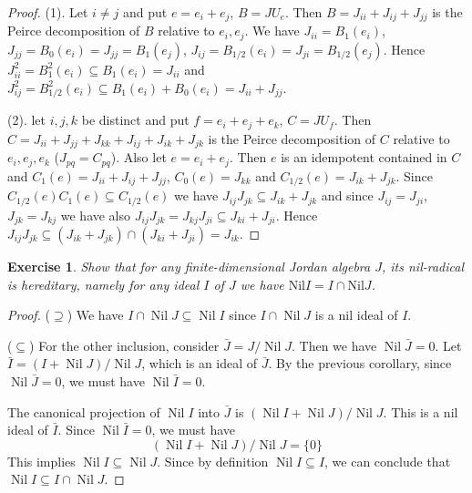 \documentclass{article}
\newtheorem{exercise}[theorem]{Exercise}
\begin{document}
\begin{proof} 
(1). Let $i \ne j$ and put $e = e_i + e_j$, $B = JU_e$. Then $B = J_{ii} + J_{ij} + J_{jj}$ is the Peirce decomposition of $B$ relative to $e_i, e_j$. We have $J_{ii} = B_1(e_i)$, $J_{jj} = B_0(e_i) = J_{jj} = B_1(e_j)$, $J_{ij} = B_{1/2}(e_i) = J_{ji} = B_{1/2}(e_j)$. Hence $J_{ii}^2 = B_1^2(e_i) \subseteq B_1(e_i) = J_{ii}$ and $J_{ij}^2 = B_{1/2}^2(e_i) \subseteq B_1(e_i) + B_0(e_i) = J_{ii} + J_{jj}$.

(2). let $i,j,k$ be distinct and put $f = e_i + e_j + e_k$, $C = JU_f$. Then $C = J_{ii} + J_{jj} + J_{kk} + J_{ij} + J_{ik} + J_{jk}$ is the Peirce decomposition of $C$ relative to $e_i, e_j, e_k$ ($J_{pq} = C_{pq}$). Also let $e = e_i + e_j$. Then $e$ is an idempotent contained in $C$ and $C_1(e) = J_{ii} + J_{ij} + J_{jj}$, $C_0(e) = J_{kk}$ and $C_{1/2}(e) = J_{ik} + J_{jk}$. Since $C_{1/2}(e)C_1(e) \subseteq C_{1/2}(e)$ we have $J_{ij}J_{jk} \subseteq J_{ik} + J_{jk}$ and since $J_{ij}=J_{ji}$, $J_{jk}=J_{kj}$ we have also $J_{ij}J_{jk} = J_{kj}J_{ji} \subseteq J_{ki} + J_{ji}$. Hence $J_{ij}J_{jk} \subseteq (J_{ik} + J_{jk}) \cap (J_{ki} + J_{ji}) = J_{ik}$. 
\end{proof}

\begin{exercise}
Show that for any finite-dimensional Jordan algebra $J$, its nil-radical is hereditary, namely for any ideal $I$ of $J$ we have $\text{Nil}I = I \cap \text{Nil}J$.  
\end{exercise}

\begin{proof} 
($\supseteq$) We have $I \cap \operatorname{Nil} J \subseteq \operatorname{Nil} I$ since $I \cap \operatorname{Nil} J$ is a nil ideal of $I$.  

($\subseteq$) For the other inclusion, consider $\bar{J} = J/\operatorname{Nil} J$. Then we have $\operatorname{Nil} \bar{J} = 0$.  
Let $\bar{I} = (I + \operatorname{Nil} J) / \operatorname{Nil} J$, which is an ideal of $\bar{J}$.  
By the previous corollary, since $\operatorname{Nil} \bar{J} = 0$, we must have $\operatorname{Nil} \bar{I} = 0$.  

The canonical projection of $\operatorname{Nil} I$ into $\bar{J}$ is $(\operatorname{Nil} I + \operatorname{Nil} J) / \operatorname{Nil} J$. This is a nil ideal of $\bar{I}$. Since $\operatorname{Nil} \bar{I} = 0$, we must have  
\[ (\operatorname{Nil} I + \operatorname{Nil} J) / \operatorname{Nil} J = \{0\} \]  
This implies $\operatorname{Nil} I \subseteq \operatorname{Nil} J$.  
Since by definition $\operatorname{Nil} I \subseteq I$, we can conclude that $\operatorname{Nil} I \subseteq I \cap \operatorname{Nil} J$.  
\end{proof}
\end{document}
